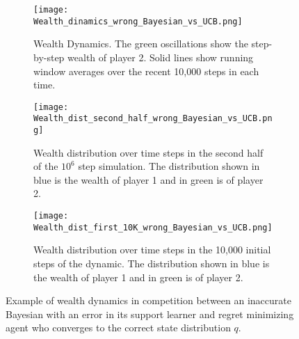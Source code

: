\begin{figure}[t!]
    \centering
    \begin{subfigure}[b]{0.325\textwidth}
        \centering
        \texttt{[image: Wealth\_dinamics\_wrong\_Bayesian\_vs\_UCB.png]}
        \vspace{-6pt}
        \caption{Wealth Dynamics. The green oscillations show the step-by-step wealth of player 2. Solid lines show running window averages over the recent 10,000 steps in each time. }
        \label{fig:wealth-dynamics}
    \end{subfigure}
    \hfill
    \begin{subfigure}[b]{0.325\textwidth}
        \centering        \texttt{[image: Wealth\_dist\_second\_half\_wrong\_Bayesian\_vs\_UCB.png]}
        \vspace{-8pt}
        \caption{Wealth distribution over time steps in the second half of the $10^6$ step simulation. The distribution shown in blue is the wealth of player 1 and in green is of player 2.}
        \label{fig:wealth-distribution-suffix}
    \end{subfigure}
    \hfill
    \begin{subfigure}[b]{0.325\textwidth}
        \centering
        \texttt{[image: Wealth\_dist\_first\_10K\_wrong\_Bayesian\_vs\_UCB.png]}
        \vspace{-8pt}
        \caption{Wealth distribution over time steps in the 10,000 initial steps of the dynamic. The distribution shown in blue is the wealth of player 1 and in green is of player 2.}
        \label{fig:wealth-distribution-prefix}
    \end{subfigure}
    \caption{Example of wealth dynamics in competition between an inaccurate Bayesian with an error in its support learner and regret minimizing agent who converges to the correct state distribution $q$.}
    \label{fig:wealth-figures}
\end{figure}


